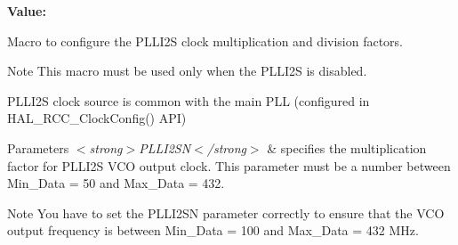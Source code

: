 {\bfseries Value\+:}
\begin{DoxyCode}{0}

\end{DoxyCode}


Macro to configure the P\+L\+L\+I2S clock multiplication and division factors. 

\begin{DoxyNote}{Note}
This macro must be used only when the P\+L\+L\+I2S is disabled. 

P\+L\+L\+I2S clock source is common with the main P\+LL (configured in H\+A\+L\+\_\+\+R\+C\+C\+\_\+\+Clock\+Config() A\+PI) 
\end{DoxyNote}

\begin{DoxyParams}{Parameters}
{\em $<$strong$>$\+P\+L\+L\+I2\+S\+N$<$/strong$>$} & specifies the multiplication factor for P\+L\+L\+I2S V\+CO output clock. This parameter must be a number between Min\+\_\+\+Data = 50 and Max\+\_\+\+Data = 432. \\
\hline
\end{DoxyParams}
\begin{DoxyNote}{Note}
You have to set the P\+L\+L\+I2\+SN parameter correctly to ensure that the V\+CO output frequency is between Min\+\_\+\+Data = 100 and Max\+\_\+\+Data = 432 M\+Hz. 
\end{DoxyNote}

